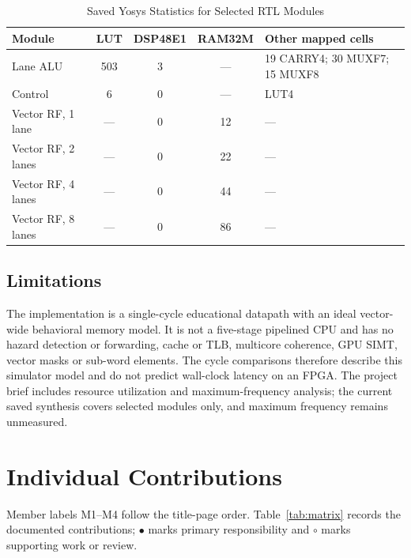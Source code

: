 \documentclass[conference]{IEEEtran}
\begin{document}
\begin{table}[H]
\caption{Saved Yosys Statistics for Selected RTL Modules}
\label{tab:synth}
\centering
\small
\scriptsize
\setlength{\tabcolsep}{3pt}
\begin{tabular}{@{}p{2.1cm} c c c p{2.7cm}@{}}
\toprule
\textbf{Module} & \textbf{LUT} & \textbf{DSP48E1} & \textbf{RAM32M} & \textbf{Other mapped cells}\\
\midrule
Lane ALU & 503 & 3 & --- & 19 CARRY4; 30 MUXF7; 15 MUXF8\\
Control & 6 & 0 & --- & LUT4\\
Vector RF, 1 lane & --- & 0 & 12 & ---\\
Vector RF, 2 lanes & --- & 0 & 22 & ---\\
Vector RF, 4 lanes & --- & 0 & 44 & ---\\
Vector RF, 8 lanes & --- & 0 & 86 & ---\\
\bottomrule
\end{tabular}
\end{table}

\subsection{Limitations}
The implementation is a single-cycle educational datapath with an ideal vector-wide behavioral memory model. It is not a five-stage pipelined CPU and has no hazard detection or forwarding, cache or TLB, multicore coherence, GPU SIMT, vector masks or sub-word elements. The cycle comparisons therefore describe this simulator model and do not predict wall-clock latency on an FPGA. The project brief includes resource utilization and maximum-frequency analysis; the current saved synthesis covers selected modules only, and maximum frequency remains unmeasured.

\section{Individual Contributions}
Member labels M1--M4 follow the title-page order. Table~\ref{tab:matrix} records the documented contributions; $\bullet$ marks primary responsibility and $\circ$ marks supporting work or review.
\end{document}
